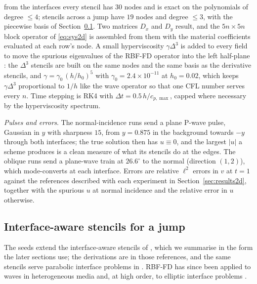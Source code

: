 \documentclass[11pt]{amsart}
\theoremstyle{definition}
\theoremstyle{remark}
\newcommand{\para}[1]{\par\smallskip\noindent\textit{#1}.\enspace}
\begin{document}
from the interfaces every stencil has $30$ nodes and is exact on the
polynomials of degree $\le 4$; stencils across a jump have $19$ nodes
and degree $\le 3$, with the piecewise basis of
Section~\ref{sec:jumpstencils}. Two matrices $D_x$ and $D_y$ result, and
the $5n \times 5n$ block operator of \eqref{eq:sys2d} is assembled from
them with the material coefficients evaluated at each row's node. A
small hyperviscosity $\gamma \Delta^3$ is added to every field to move
the spurious eigenvalues of the RBF-FD operator into the left half-plane
\cite{FornbergLehto2011}: the $\Delta^3$ stencils are built on the same
nodes and the same basis as the derivative stencils, and
$\gamma = \gamma_0\, (h / h_0)^5$ with $\gamma_0 = 2.4 \times 10^{-11}$
at $h_0 = 0.02$, which keeps $\gamma \Delta^3$ proportional to $1 / h$
like the wave operator so that one CFL number serves every $n$. Time
stepping is RK4 with $\Delta t = 0.5\, h / c_{p,\max}$, capped where
necessary by the hyperviscosity spectrum.

\para{Pulses and errors}
The normal-incidence runs send a plane P-wave pulse, Gaussian in $y$
with sharpness $15$, from $y = 0.875$ in the background towards $-y$
through both interfaces; the true solution then has $u \equiv 0$, and
the largest $|u|$ a scheme produces is a clean measure of what its
stencils do at the edges. The oblique runs send a plane-wave train at
$26.6^\circ$ to the normal (direction $(1, 2)$), which mode-converts at
each interface. Errors are relative $\ell^2$ errors in $v$ at $t = 1$
against the references described with each experiment in
Section~\ref{sec:results2d}, together with the spurious $u$ at normal
incidence and the relative error in $u$ otherwise.

\subsection{Interface-aware stencils for a jump}
\label{sec:jumpstencils}
The seeds extend the interface-aware stencils of
\cite{Martin2016,MartinFornberg2017}, which we summarise in the form the
later sections use; the derivations are in those references, and the
same stencils serve parabolic interface problems in
\cite{MartinFornberg2017heat}. RBF-FD has since been applied to waves in
heterogeneous media \cite{BerljavacEtAl2021} and, at high order, to
elliptic interface problems \cite{ChengJuZhang2026}.
\end{document}
